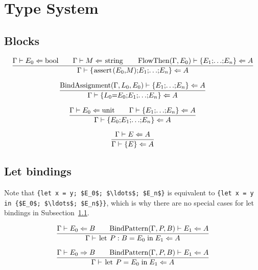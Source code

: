 \section{Type System}
\label{sec:types}

\newcommand{\tcheck}[3]{#1 \vdash #2 \Leftarrow #3}
\newcommand{\tinfer}[3]{#1 \vdash #2 \Rightarrow #3}
\newcommand{\msail}[1]{\text{\lstinline[mathescape]+#1+}}

\subsection{Blocks}
\label{subsec:blocks}

\[
\frac{\tcheck{\Gamma}{E_0}{\text{\lstinline+bool+}}
      \qquad
      \tcheck{\Gamma}{M}{\text{\lstinline+string+}}
      \qquad
      \tcheck{\mathrm{FlowThen}(\Gamma, E_0)}{\text{\lstinline[mathescape]+\{$E_1$; $\ldots$; $E_n$\}+}}{A}}
     {\tcheck{\Gamma}{\text{\lstinline[mathescape]+\{assert($E_0$, $M$); $E_1$; $\ldots$; $E_n$ \}+}}{A}}
\]

\[
\frac{\tcheck{\mathrm{BindAssignment}(\Gamma, L_0, E_0)}{\text{\lstinline[mathescape]+\{$E_1$; $\ldots$; $E_n$\}+}}{A}}
     {\tcheck{\Gamma}{\text{\lstinline[mathescape]+\{$L_0$ = $E_0$; $E_1$; $\ldots$; $E_n$ \}+}}{A}}
\]

\[
\frac{\tcheck{\Gamma}{E_0}{\text{\lstinline+unit+}}
      \qquad
      \tcheck{\Gamma}{\text{\lstinline[mathescape]+\{$E_1$; $\ldots$; $E_n$\}+}}{A}}
     {\tcheck{\Gamma}{\text{\lstinline[mathescape]+\{$E_0$; $E_1$; $\ldots$; $E_n$ \}+}}{A}}
\]

\[
\frac{\tcheck{\Gamma}{E}{A}}
     {\tcheck{\Gamma}{\text{\lstinline[mathescape]+\{$E$\}+}}{A}}
\]

\subsection{Let bindings}

Note that \lstinline[mathescape]+{let x = y; $E_0$; $\ldots$; $E_n$}+
is equivalent to \lstinline[mathescape]+{let x = y in {$E_0$; $\ldots$; $E_n$}}+,
which is why there are no special cases for let bindings in Subsection~\ref{subsec:blocks}.

\[
\frac{\tcheck{\Gamma}{E_0}{B}
      \qquad
      \tcheck{\mathrm{BindPattern}(\Gamma, P, B)}{E_1}{A}}
     {\tcheck{\Gamma}{\msail{let $\;P\;$ : $\;B\;$ = $\;E_0\;$ in $\;E_1$}}{A}}
\]

\[
\frac{\tinfer{\Gamma}{E_0}{B}
      \qquad
      \tcheck{\mathrm{BindPattern}(\Gamma, P, B)}{E_1}{A}}
     {\tcheck{\Gamma}{\msail{let $\;P\;$ = $\;E_0\;$ in $\;E_1$}}{A}}
\]

